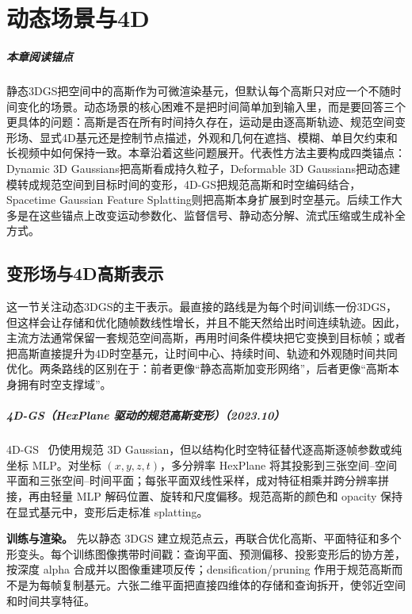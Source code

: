 \chapter{动态场景与4D}

\paragraph*{本章阅读锚点}
静态3DGS把空间中的高斯作为可微渲染基元，但默认每个高斯只对应一个不随时间变化的场景。动态场景的核心困难不是把时间简单加到输入里，而是要回答三个更具体的问题：高斯是否在所有时间持久存在，运动是由逐高斯轨迹、规范空间变形场、显式4D基元还是控制节点描述，外观和几何在遮挡、模糊、单目欠约束和长视频中如何保持一致。本章沿着这些问题展开。代表性方法主要构成四类锚点：Dynamic 3D Gaussians把高斯看成持久粒子，Deformable 3D Gaussians把动态建模转成规范空间到目标时间的变形，4D-GS把规范高斯和时空编码结合，Spacetime Gaussian Feature Splatting则把高斯本身扩展到时空基元。后续工作大多是在这些锚点上改变运动参数化、监督信号、静动态分解、流式压缩或生成补全方式。

\section{变形场与4D高斯表示}

这一节关注动态3DGS的主干表示。最直接的路线是为每个时间训练一份3DGS，但这样会让存储和优化随帧数线性增长，并且不能天然给出时间连续轨迹。因此，主流方法通常保留一套规范空间高斯，再用时间条件模块把它变换到目标帧；或者把高斯直接提升为4D时空基元，让时间中心、持续时间、轨迹和外观随时间共同优化。两条路线的区别在于：前者更像“静态高斯加变形网络”，后者更像“高斯本身拥有时空支撑域”。



\paragraph{4D-GS（HexPlane 驱动的规范高斯变形）（2023.10）}
4D-GS~\cite{2310_08528} 仍使用规范 3D Gaussian，但以结构化时空特征替代逐高斯逐帧参数或纯坐标 MLP。对坐标 $(x,y,z,t)$，多分辨率 HexPlane 将其投影到三张空间--空间平面和三张空间--时间平面；每张平面双线性采样，成对特征相乘并跨分辨率拼接，再由轻量 MLP 解码位置、旋转和尺度偏移。规范高斯的颜色和 opacity 保持在显式基元中，变形后走标准 splatting。

\textbf{训练与渲染。} 先以静态 3DGS 建立规范点云，再联合优化高斯、平面特征和多个形变头。每个训练图像携带时间戳：查询平面、预测偏移、投影变形后的协方差，按深度 alpha 合成并以图像重建项反传；densification/pruning 作用于规范高斯而不是为每帧复制基元。六张二维平面把直接四维体的存储和查询拆开，使邻近空间和时间共享特征。

